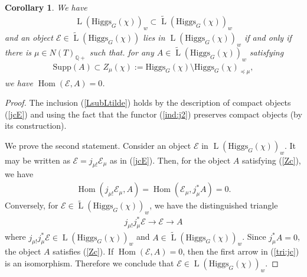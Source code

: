 \documentclass [11pt,oneside,a4paper,mathscr]{amsart}
\newtheorem{cor}[thm]{Corollary}
\theoremstyle{definition}
\newcommand{\LL}{\operatorname{L}}
\newcommand{\Hom}{\operatorname{Hom}}
\newcommand{\Hig}{\mathrm{Higgs}}
\begin{document}
\begin{cor}\label{cor:Ltilde}
We have 
\begin{align}\label{LsubLtilde}
\LL(\Hig_{G}(\chi))_w \subset \widetilde{\LL}(\Hig_{G}(\chi))_{w}
\end{align}
and an object $\mathcal{E} \in \widetilde{\LL}(\Hig_{G}(\chi))$
lies in $\LL(\Hig_{G}(\chi))_w$ if and only if 
    there is $\mu \in N(T)_{\mathbb{Q}+}$ such that. for any $A \in \widetilde{\LL}(\Hig_{G}(\chi))_w$
    satisfying 
    \begin{align}\label{Zc}
\mathrm{Supp}(A) \subset Z_{\mu}(\chi):=\Hig_{G}(\chi)\setminus\Hig_G(\chi)_{\preceq \mu},
    \end{align}
    we have $\Hom(\mathcal{E}, A)=0$. 
\end{cor}
\begin{proof}
    The inclusion (\ref{LsubLtilde}) holds 
    by the description of compact objects (\ref{jcE}) and using the fact that the functor (\ref{ind:j2})
    preserves compact objects (by its construction). 

    We prove the second statement. Consider an object $\mathcal{E}$ 
    in $\LL(\Hig_{G}(\chi))_w$. It may be written as $\mathcal{E}=j_{\mu!}\mathcal{E}_{\mu}$
    as in (\ref{jcE}). Then, for the object $A$ satisfying (\ref{Zc}), we have 
    \begin{align*}
        \Hom(j_{\mu!}\mathcal{E}_{\mu}, A)=\Hom(\mathcal{E}_{\mu}, j_{\mu}^{\ast}A)=0. 
    \end{align*}
    Conversely, for $\mathcal{E} \in \widetilde{\LL}(\Hig_{G}(\chi))_w$, 
    we have the distinguished triangle 
    \begin{align}\label{tri:jc}
        j_{\mu!}j_{\mu}^{\ast}\mathcal{E} \to \mathcal{E} \to A
    \end{align}
    where $j_{\mu!}j_{\mu}^{\ast}\mathcal{E} \in \LL(\Hig_{G}(\chi))_w$
    and $A \in \widetilde{\LL}(\Hig_{G}(\chi))_w$. Since $j_{\mu}^*A=0$, the object $A$ 
    satisfies (\ref{Zc}). 
    If $\Hom(\mathcal{E}, A)=0$, then the first arrow in (\ref{tri:jc}) is an isomorphism. 
    Therefore we conclude that $\mathcal{E} \in \LL(\Hig_{G}(\chi))_w$. 
\end{proof}
\end{document}
